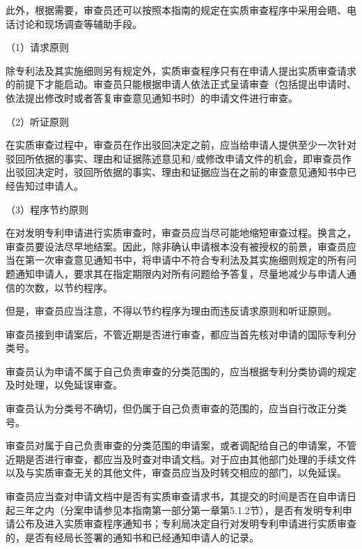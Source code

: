 此外，根据需要，审查员还可以按照本指南的规定在实质审查程序中采用会晤、电话讨论和现场调查等辅助手段。

{\setlength{\parindent}{17.1bp}（1）请求原则\par}

除专利法及其实施细则另有规定外，实质审查程序只有在申请人提出实质审查请求的前提下才能启动。审查员只能根据申请人依法正式呈请审查（包括提出申请时、依法提出修改时或者答复审查意见通知书时）的申请文件进行审查。

{\setlength{\parindent}{17.1bp}（2）听证原则\par}

在实质审查过程中，审查员在作出驳回决定之前，应当给申请人提供至少一次针对驳回所依据的事实、理由和证据陈述意见和/或修改申请文件的机会，即审查员作出驳回决定时，驳回所依据的事实、理由和证据应当在之前的审查意见通知书中已经告知过申请人。

{\setlength{\parindent}{17.1bp}（3）程序节约原则\par}

在对发明专利申请进行实质审查时，审查员应当尽可能地缩短审查过程。换言之，审查员要设法尽早地结案。因此，除非确认申请根本没有被授权的前景，审查员应当在第一次审查意见通知书中，将申请中不符合专利法及其实施细则规定的所有问题通知申请人，要求其在指定期限内对所有问题给予答复，尽量地减少与申请人通信的次数，以节约程序。

但是，审查员应当注意，不得以节约程序为理由而违反请求原则和听证原则。

审查员接到申请案后，不管近期是否进行审查，都应当首先核对申请的国际专利分类号。

审查员认为申请不属于自己负责审查的分类范围的，应当根据专利分类协调的规定及时处理，以免延误审查。

审查员认为分类号不确切，但仍属于自己负责审查的范围的，应当自行改正分类号。

审查员对属于自己负责审查的分类范围的申请案，或者调配给自己的申请案，不管近期是否进行审查，都应当及时查对申请文档。对于应由其他部门处理的手续文件以及与实质审查无关的其他文件，审查员应当及时转交相应的部门，以免延误。

审查员应当查对申请文档中是否有实质审查请求书，其提交的时间是否在自申请日起三年之内（分案申请参见本指南第一部分第一章第5.1.2节），是否有发明专利申请公布及进入实质审查程序通知书；专利局决定自行对发明专利申请进行实质审查的，是否有经局长签署的通知书和已经通知申请人的记录。

